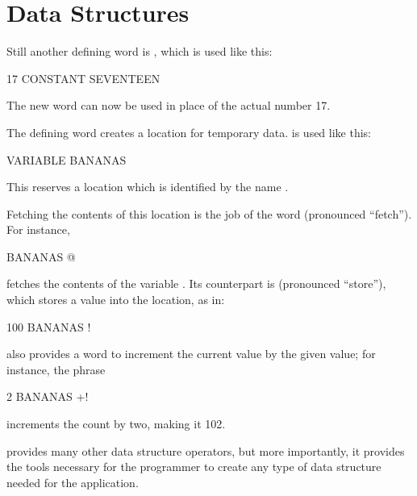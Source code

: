 \section{Data Structures}%
%

Still another defining word is , which
is used like this:
\begin{Code}
17 CONSTANT SEVENTEEN
\end{Code}
The new word  can now be used in place of the actual
number 17.

{\sloppy
The defining word  creates a location
for temporary data.  is used like this:
\begin{Code}
VARIABLE BANANAS
\end{Code}
This reserves a location which is identified by the name .}

Fetching the contents of this location is the job of the word 
(pronounced ``fetch'').  For instance,
\begin{Code}
BANANAS @
\end{Code}
fetches the contents of the variable .  Its counterpart is
\forthb{!} (pronounced ``store''), which stores a value into the location,
as in:
\begin{Code}
100 BANANAS !
\end{Code}
\Forth{} also provides a word to increment the current value by the given
value; for instance, the phrase
\begin{Code}
2 BANANAS +!
\end{Code}
increments the count by two, making it 102.

\Forth{} provides many other
data structure operators, but more
importantly, it provides the tools necessary for the programmer to
create any type of data structure needed for the application.%
%


